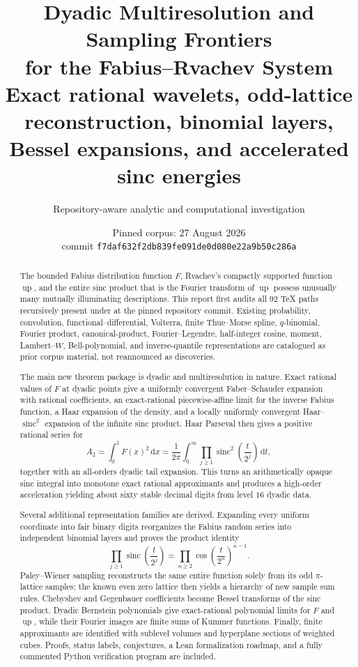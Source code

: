 \documentclass[11pt,oneside]{article}
\title{\bfseries Dyadic Multiresolution and Sampling Frontiers\\[0.25em]
for the Fabius--Rvachev System\\[0.45em]
\large Exact rational wavelets, odd-lattice reconstruction, binomial layers,\\
Bessel expansions, and accelerated sinc energies}
\author{Repository-aware analytic and computational investigation}
\date{Pinned corpus: 27 August 2026\\
\small commit \nolinkurl{f7daf632f2db839fe091de0d080e22a9b50c286a}}
\theoremstyle{definition}
\theoremstyle{remark}
\newcommand{\Up}{\operatorname{up}}
\newcommand{\sinc}{\operatorname{sinc}}
\newcommand{\dd}{\,\mathrm d}
\newcommand{\1}{\mathbf 1}
\begin{document}
\maketitle

\begin{abstract}
The bounded Fabius distribution function $F$, Rvachev's compactly supported
function $\Up$, and the entire sinc product that is the Fourier transform of
$\Up$ possess unusually many mutually illuminating descriptions.  This report
first audits all $92$ TeX paths recursively present under
 at the pinned repository commit.  Existing
probability, convolution, functional--differential, Volterra, finite
Thue--Morse spline, $q$-binomial, Fourier product, canonical-product,
Fourier--Legendre, half-integer cosine, moment, Lambert--$W$, Bell-polynomial,
and inverse-quantile representations are catalogued as prior corpus material,
not reannounced as discoveries.

The main new theorem package is dyadic and multiresolution in nature.  Exact
rational values of $F$ at dyadic points give a uniformly convergent
Faber--Schauder expansion with rational coefficients, an exact-rational
piecewise-affine limit for the inverse Fabius function, a Haar expansion of
the density, and a locally uniformly convergent Haar--$\sinc^2$ expansion of
the infinite sinc product.  Haar Parseval then gives a positive rational series
for
\[
 A_2=\int_0^1F(x)^2\dd x
    =\frac1{2\pi}\int_0^\infty
      \prod_{j\ge1}\sinc^2\!\left(\frac{t}{2^j}\right)\dd t,
\]
together with an all-orders dyadic tail expansion.  This turns an arithmetically
opaque sinc integral into monotone exact rational approximants and produces a
high-order acceleration yielding about sixty stable decimal digits from level
$16$ dyadic data.

Several additional representation families are derived.  Expanding every
uniform coordinate into fair binary digits reorganizes the Fabius random
series into independent binomial layers and proves the product identity
\[
 \prod_{j\ge1}\sinc\!\left(\frac{t}{2^j}\right)
 =\prod_{n\ge2}\cos\!\left(\frac{t}{2^n}\right)^{n-1}.
\]
Paley--Wiener sampling reconstructs the same entire function solely from its
odd $\pi$-lattice samples; the known even zero lattice then yields a hierarchy
of new sample sum rules.  Chebyshev and Gegenbauer coefficients become
Bessel transforms of the sinc product.  Dyadic Bernstein polynomials give
exact-rational polynomial limits for $F$ and $\Up$, while their Fourier images
are finite sums of Kummer functions.  Finally, finite approximants are
identified with sublevel volumes and hyperplane sections of weighted cubes.
Proofs, status labels, conjectures, a Lean formalization roadmap, and a fully
commented Python verification program are included.
\end{abstract}
\end{document}
